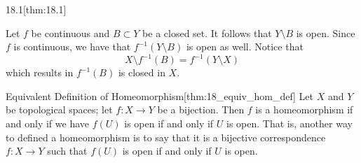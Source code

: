 \begin{thmBox}{18.1}[thm:18.1]
\begin{proofBox}
        \baseSkip 


        Let \( f \) be continuous and \( B \subset Y \) be a closed set.
        It follows that \( Y \setminus B \) is open.
        Since \( f \) is continuous, we have that 
        \( f^{ -1 } ( Y \setminus B ) \) is open as well.
        Notice that 
        \begin{equation*}
            X \setminus f^{ -1 } ( B ) = f^{ -1 } ( Y \setminus X )
        \end{equation*}
        which results in \( f^{ -1 } ( B ) \) is closed in \( X \).
    \end{proofBox}
\end{thmBox}

\begin{thmBox}{Equivalent Definition of Homeomorphism}[thm:18_equiv_hom_def]
    Let \( X \) and \( Y \) be topological spaces; let \( f : X \rightarrow Y \)
    be a bijection.
    Then \( f \) is a homeomorphism if and only if we have \( f ( U ) \) is open
    if and only if \( U \) is open.
    That is, another way to defined a homeomorphism is to say that it is a 
    bijective correspondence \( f: X \rightarrow Y \) such that \( f ( U ) \) 
    is open if and only if \( U \) is open.

    \baseRule

    \begin{proofBox}

    \end{proofBox}
\end{thmBox}

